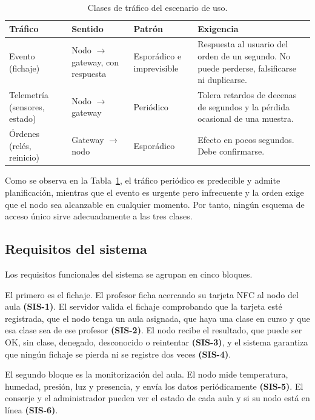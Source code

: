 \begin{table}[htbp]
\centering
\caption{Clases de tráfico del escenario de uso.}\label{tab:trafico}
\renewcommand{\arraystretch}{1.3}
\begin{tabularx}{\textwidth}{p{2.4cm} p{2.4cm} p{2.4cm} X}
\toprule
\textbf{Tráfico} & \textbf{Sentido} & \textbf{Patrón} & \textbf{Exigencia} \\
\midrule
Evento (fichaje) & Nodo $\rightarrow$ gateway, con respuesta & Esporádico e imprevisible & Respuesta al usuario del orden de un segundo. No puede perderse, falsificarse ni duplicarse. \\
\midrule
Telemetría (sensores, estado) & Nodo $\rightarrow$ gateway & Periódico & Tolera retardos de decenas de segundos y la pérdida ocasional de una muestra. \\
\midrule
Órdenes (relés, reinicio) & Gateway $\rightarrow$ nodo & Esporádico & Efecto en pocos segundos. Debe confirmarse. \\
\bottomrule
\end{tabularx}
\end{table}

Como se observa en la Tabla~\ref{tab:trafico}, el tráfico periódico es predecible y admite planificación, mientras que el evento es urgente pero infrecuente y la orden exige que el nodo sea alcanzable en cualquier momento. Por tanto, ningún esquema de acceso único sirve adecuadamente a las tres clases.

\subsection{Requisitos del sistema}

Los requisitos funcionales del sistema se agrupan en cinco bloques.

El primero es el fichaje. El profesor ficha acercando su tarjeta NFC al nodo del aula \textbf{(SIS-1)}. El servidor valida el fichaje comprobando que la tarjeta esté registrada, que el nodo tenga un aula asignada, que haya una clase en curso y que esa clase sea de ese profesor \textbf{(SIS-2)}. El nodo recibe el resultado, que puede ser OK, sin clase, denegado, desconocido o reintentar \textbf{(SIS-3)}, y el sistema garantiza que ningún fichaje se pierda ni se registre dos veces \textbf{(SIS-4)}.

El segundo bloque es la monitorización del aula. El nodo mide temperatura, humedad, presión, luz y presencia, y envía los datos periódicamente \textbf{(SIS-5)}. El conserje y el administrador pueden ver el estado de cada aula y si su nodo está en línea \textbf{(SIS-6)}.

